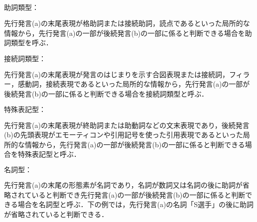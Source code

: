 \begin{description}
\item{\boldmath $助詞類型：$} 

先行発言(a)の末尾表現が格助詞または接続助詞，読点であるといった局所的な
情報から，先行発言(a)の一部が後続発言(b)の一部に係ると判断できる場合を助
詞類型を呼ぶ． 

  

  

\item{\boldmath $接続詞類型：$}

先行発言(a)の末尾表現が発言のはじまりを示す合図表現または接続詞，フィラ
ー，感動詞，接続表現であるといった局所的な情報から，先行発言(a)の一部が
後続発言(b)の一部に係ると判断できる場合を接続詞類型と呼ぶ．

  

\item{\boldmath $特殊表記型：$}

先行発言(a)の末尾表現が終助詞または助動詞などの文末表現であり，後続発言
(b)の先頭表現がエモーティコンや引用記号を使った引用表現であるといった局
所的な情報から，先行発言(a)の一部が後続発言(b)の一部に係ると判断できる場
合を特殊表記型と呼ぶ．


\item{\boldmath $名詞型：$}

先行発言(a)の末尾の形態素が名詞であり，名詞が数詞又は名詞の後に助詞が省
略されていると判断でき先行発言(a)の一部が後続発言(b)の一部に係ると判断で
きる場合を名詞型と呼ぶ．下の例では，先行発言(a)の名詞「S選手」の後に助詞
が省略されていると判断できる．




\end{description}

